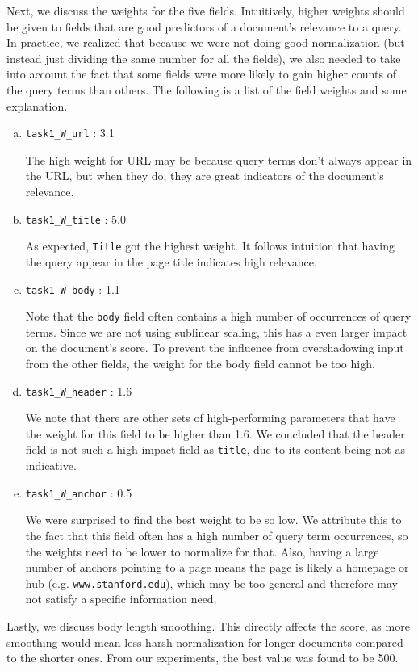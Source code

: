 \documentclass[10pt,twocolumn]{article}
\begin{document}
Next, we discuss the weights for the five fields. Intuitively, higher weights should be given to fields that are good predictors of a document's relevance to a query. In practice, we realized that because we were not doing good normalization (but instead just dividing the same number for all the fields), we also needed to take into account the fact that some fields were more likely to gain higher counts of the query terms than others. The following is a list of the field weights and some explanation.
\begin{enumerate}[(a)]
\item \texttt{task1\_W\_url} : 3.1

The high weight for URL may be because query terms don't always appear in the URL, but when they do, they are great indicators of the document's relevance.
\item \texttt{task1\_W\_title} : 5.0

As expected, \texttt{Title} got the highest weight. It follows intuition that having the query appear in the page title indicates high relevance. 
\item \texttt{task1\_W\_body} : 1.1

Note that the \texttt{body} field often contains a high number of occurrences of query terms. Since we are not using sublinear scaling, this has a even larger impact on the document's score. To prevent the influence from overshadowing input from the other fields, the weight for the body field cannot be too high.
\item \texttt{task1\_W\_header} : 1.6

We note that there are other sets of high-performing parameters that have the weight for this field to be higher than 1.6. We concluded that the header field is not such a high-impact field as \texttt{title}, due to its content being not as indicative.
\item \texttt{task1\_W\_anchor} : 0.5

We were surprised to find the best weight to be so low. We attribute this to the fact that this field often has a high number of query term occurrences, so the weights need to be lower to normalize for that. Also, having a large number of anchors pointing to a page means the page is likely a homepage or hub (e.g. \texttt{www.stanford.edu}), which may be too general and therefore may not satisfy a specific information need.
\end{enumerate}

Lastly, we discuss body length smoothing. This directly affects the score, as more smoothing would mean less harsh normalization for longer documents compared to the shorter ones. From our experiments, the best value was found to be 500.
\end{document}
